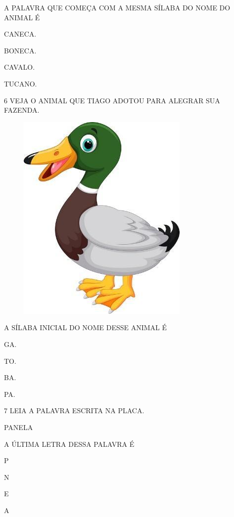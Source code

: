 A PALAVRA QUE COMEÇA COM A MESMA SÍLABA DO NOME DO ANIMAL É 

\begin{escolha}
\item CANECA.

\item BONECA.

\item CAVALO.

\item TUCANO.
\end{escolha}

\pagebreak
\num{6} VEJA O ANIMAL QUE TIAGO ADOTOU PARA ALEGRAR SUA FAZENDA.

\begin{figure}[htpb]
\centering
\includegraphics[width=.3\textwidth]{media/image215.jpg}
\end{figure}

A SÍLABA INICIAL DO NOME DESSE ANIMAL É

\begin{escolha}
\item GA.

\item TO.

\item BA.

\item PA.
\end{escolha}

\num{7} LEIA A PALAVRA ESCRITA NA PLACA.

\begin{myquote}
PANELA
\end{myquote}

A ÚLTIMA LETRA DESSA PALAVRA É

\begin{escolha}
\item P

\item N

\item E

\item A
\end{escolha}

